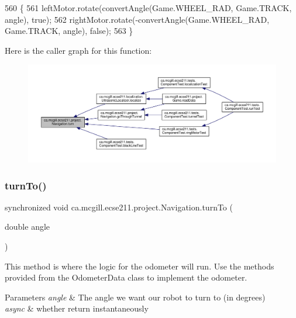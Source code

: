 \begin{DoxyCode}
560                               \{
561     leftMotor.rotate(convertAngle(Game.WHEEL\_RAD, Game.TRACK, angle), \textcolor{keyword}{true});
562     rightMotor.rotate(-convertAngle(Game.WHEEL\_RAD, Game.TRACK, angle), \textcolor{keyword}{false});
563   \}
\end{DoxyCode}
Here is the caller graph for this function\+:
\nopagebreak
\begin{figure}[H]
\begin{center}
\leavevmode
\includegraphics[width=350pt]{classca_1_1mcgill_1_1ecse211_1_1project_1_1_navigation_ad74286ad36d333bfaf57661837457b76_icgraph}
\end{center}
\end{figure}
\mbox{\label{classca_1_1mcgill_1_1ecse211_1_1project_1_1_navigation_a3bbe0645f2b3b3d0986b4a707fb5a00c}} 
\subsubsection{\texorpdfstring{turn\+To()}{turnTo()}}
{\footnotesize\ttfamily synchronized void ca.\+mcgill.\+ecse211.\+project.\+Navigation.\+turn\+To (\begin{DoxyParamCaption}\item[{double}]{angle }\end{DoxyParamCaption})}

This method is where the logic for the odometer will run. Use the methods provided from the Odometer\+Data class to implement the odometer.


\begin{DoxyParams}{Parameters}
{\em angle} & The angle we want our robot to turn to (in degrees) \\
\hline
{\em async} & whether return instantaneously \\
\hline
\end{DoxyParams}


